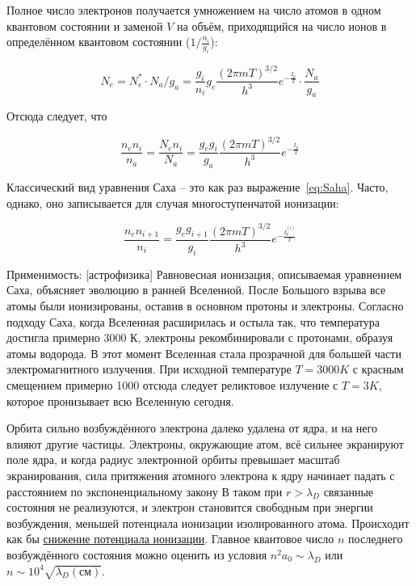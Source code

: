 \documentclass[10pt, a4paper]{article}
\numberwithin{equation}{section}
\begin{document}
Полное число электронов получается умножением на число атомов в одном квантовом состоянии и заменой $V$ на объём, приходящийся на число ионов в определённом квантовом состоянии ($1/\frac{n_i}{g_i}$):

\begin{equation*}
	N_e = N_e^{*} \cdot N_a/g_a = \frac{g_i}{n_i} g_e\frac{(2\pi mT)^{3/2}}{h^3}e^{-\frac{I_p}{T}} \cdot \frac{N_a}{g_a}
\end{equation*}

Отсюда следует, что

\begin{equation} \label{eq:Saha}
	\frac{n_en_i}{n_a} = \frac{N_en_i}{N_a} = \frac{g_eg_i}{g_a} \frac{(2\pi mT)^{3/2}}{h^3}e^{-\frac{I_p}{T}}
\end{equation}

Классический вид уравнения Саха -- это как раз выражение~\ref{eq:Saha}. Часто, однако, оно записывается для случая многоступенчатой ионизации:

\begin{equation*}
	\frac{n_en_{i+1}}{n_i} = \frac{g_eg_{i+1}}{g_i} \frac{(2\pi mT)^{3/2}}{h^3}e^{-\frac{I_p^{(i)}}{T}}
\end{equation*}

Применимость: [астрофизика] Равновесная ионизация, описываемая уравнением Саха, объясняет эволюцию в ранней Вселенной. После Большого взрыва все атомы были ионизированы, оставив в основном протоны и электроны. Согласно подходу Саха, когда Вселенная расширилась и остыла так, что температура достигла примерно 3000 К, электроны рекомбинировали с протонами, образуя атомы водорода. В этот момент Вселенная стала прозрачной для большей части электромагнитного излучения. При исходной температуре $T = 3000 K$ с красным смещением примерно 1000 отсюда следует реликтовое излучение с $T = 3 K$, которое пронизывает всю Вселенную сегодня. 

Орбита сильно возбуждённого электрона далеко удалена от ядра, и на него влияют другие частицы. Электроны, окружающие атом, всё сильнее экранируют поле ядра, и когда радиус электронной орбиты превышает масштаб экранирования, сила притяжения атомного электрона к ядру начинает падать с расстоянием по экспоненциальному закону В таком при $r>\lambda_D$ связанные состояния не реализуются, и электрон становится свободным при энергии возбуждения, меньшей потенциала ионизации изолированного атома. Происходит как бы \uline{снижение потенциала ионизации}. Главное квантовое число $n$ последнего возбуждённого состояния можно оценить из условия $n^2a_0 \sim \lambda_D$ или $n \sim 10^4\sqrt{\lambda_D(\text{см})}$.
\end{document}
